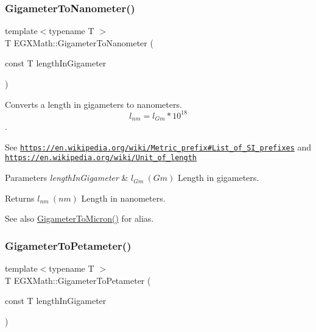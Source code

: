\subsubsection{\texorpdfstring{Gigameter\+To\+Nanometer()}{GigameterToNanometer()}}
{\footnotesize\ttfamily template$<$typename T $>$ \\
T E\+G\+X\+Math\+::\+Gigameter\+To\+Nanometer (\begin{DoxyParamCaption}\item[{const T}]{length\+In\+Gigameter }\end{DoxyParamCaption})}



Converts a length in gigameters to nanometers. \[ l_{nm}=l_{Gm} * 10^{18} \]. 

See \href{https://en.wikipedia.org/wiki/Metric_prefix#List_of_SI_prefixes}{\tt https\+://en.\+wikipedia.\+org/wiki/\+Metric\+\_\+prefix\#\+List\+\_\+of\+\_\+\+S\+I\+\_\+prefixes} and \href{https://en.wikipedia.org/wiki/Unit_of_length}{\tt https\+://en.\+wikipedia.\+org/wiki/\+Unit\+\_\+of\+\_\+length} 
\begin{DoxyParams}{Parameters}
{\em length\+In\+Gigameter} & $ l_{Gm}\ (Gm)$ Length in gigameters. \\
\hline
\end{DoxyParams}
\begin{DoxyReturn}{Returns}
$ l_{nm}\ (nm)$ Length in nanometers. 
\end{DoxyReturn}
\begin{DoxySeeAlso}{See also}
\mbox{\hyperlink{group___e_g_x_math-_conversions-_length_conversions-_gigameter-_non-_s_i_ga90426d22455e96b1f61e1850c7b89f77}{Gigameter\+To\+Micron()}} for alias. 
\end{DoxySeeAlso}
\mbox{\label{group___e_g_x_math-_conversions-_length_conversions-_gigameter-_s_i_gae0dceabe14b5e84394285441be46bb8d}} 
\subsubsection{\texorpdfstring{Gigameter\+To\+Petameter()}{GigameterToPetameter()}}
{\footnotesize\ttfamily template$<$typename T $>$ \\
T E\+G\+X\+Math\+::\+Gigameter\+To\+Petameter (\begin{DoxyParamCaption}\item[{const T}]{length\+In\+Gigameter }\end{DoxyParamCaption})}



